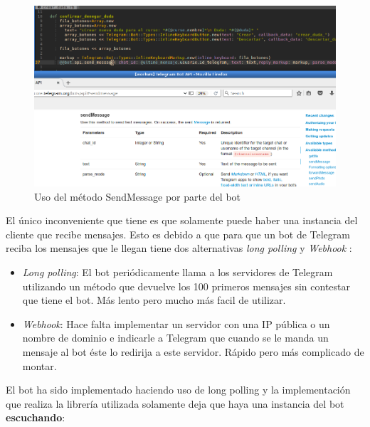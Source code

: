 \begin{figure}[H] %
\centering
\includegraphics[scale=0.42]{imagenes/random/Screenshot_2017-08-27_08-16-42.png}  %

\caption{Uso del método SendMessage por parte del bot }\label{figura531}
\end{figure}
El único inconveniente que tiene es que solamente puede haber una instancia del cliente que recibe mensajes. Esto es debido a que para que un bot de Telegram reciba los mensajes que le llegan tiene dos alternativas \textit{long polling} y \textit{Webhook}\cite{telegram10}\cite{telegram20} :
\begin{itemize}
\item \textit{Long polling}: El bot periódicamente llama a los servidores de Telegram utilizando un método que devuelve los 100 primeros mensajes  sin contestar que tiene el bot. Más lento pero mucho más facil de utilizar.
\item \textit{Webhook}: Hace falta implementar un servidor con una IP pública o un nombre de dominio e indicarle a Telegram que cuando se le manda un mensaje al bot éste lo redirija a este servidor. Rápido pero más complicado de montar.
\end{itemize}

El bot ha sido implementado haciendo uso de long polling y la implementación que realiza la librería utilizada  solamente deja que haya una instancia del bot \textbf{escuchando}:


